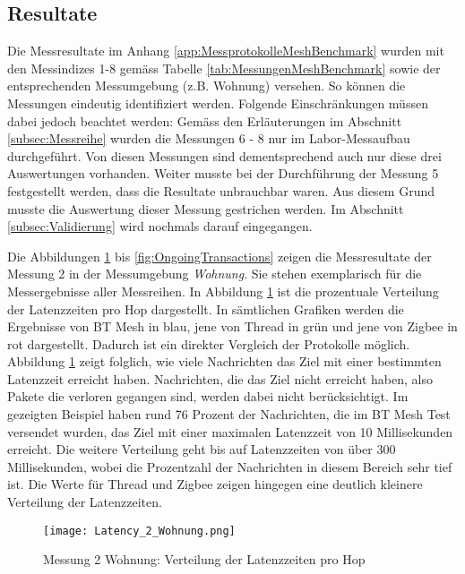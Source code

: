 \subsection{Resultate}\label{subsec:Resultate}
Die Messresultate im Anhang \ref{app:MessprotokolleMeshBenchmark} wurden mit den Messindizes 1-8 gemäss Tabelle \ref{tab:MessungenMeshBenchmark} sowie der entsprechenden Messumgebung (z.B. Wohnung) versehen.
So können die Messungen eindeutig identifiziert werden.
Folgende Einschränkungen müssen dabei jedoch beachtet werden:
Gemäss den Erläuterungen im Abschnitt \ref{subsec:Messreihe} wurden die Messungen 6 - 8 nur im Labor-Messaufbau durchgeführt. Von diesen Messungen sind dementsprechend auch nur diese drei Auswertungen vorhanden.
Weiter musste bei der Durchführung der Messung 5 festgestellt werden, dass die Resultate unbrauchbar waren.
Aus diesem Grund musste die Auswertung dieser Messung gestrichen werden.
Im Abschnitt \ref{subsec:Validierung} wird nochmals darauf eingegangen.

Die Abbildungen \ref{fig:VerteilungderLatenzzeiten} bis \ref{fig:OngoingTransactions} zeigen die Messresultate der Messung 2 in der Messumgebung \textit{Wohnung}. Sie stehen exemplarisch für die Messergebnisse aller Messreihen.
In Abbildung \ref{fig:VerteilungderLatenzzeiten} ist die prozentuale Verteilung der Latenzzeiten pro Hop dargestellt.
In sämtlichen Grafiken werden die Ergebnisse von BT Mesh in blau, jene von Thread in grün und jene von Zigbee in rot dargestellt.
Dadurch ist ein direkter Vergleich der Protokolle möglich.
Abbildung \ref{fig:VerteilungderLatenzzeiten} zeigt folglich, wie viele Nachrichten das Ziel mit einer bestimmten Latenzzeit erreicht haben.
Nachrichten, die das Ziel nicht erreicht haben, also Pakete die verloren gegangen sind, werden dabei nicht berücksichtigt.
Im gezeigten Beispiel haben rund 76 Prozent der Nachrichten, die im BT Mesh Test versendet wurden, das Ziel mit einer maximalen Latenzzeit von 10 Millisekunden erreicht.
Die weitere Verteilung geht bis auf Latenzzeiten von über 300 Millisekunden, wobei die Prozentzahl der Nachrichten in diesem Bereich sehr tief ist.
Die Werte für Thread und Zigbee zeigen hingegen eine deutlich kleinere Verteilung der Latenzzeiten.

\begin{figure}[h]
	\centering
	\texttt{[image: Latency\_2\_Wohnung.png]}
	\caption{Messung 2 Wohnung: Verteilung der Latenzzeiten pro Hop}
	\label{fig:VerteilungderLatenzzeiten}
\end{figure}


